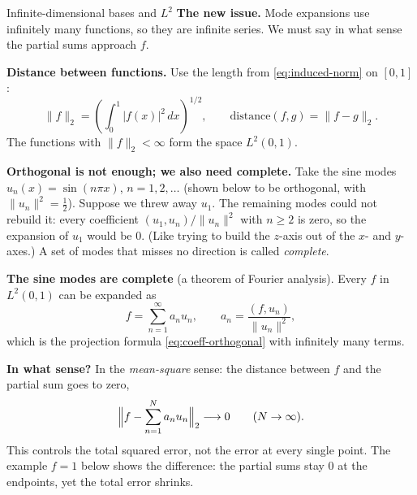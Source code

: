 \documentclass[11pt]{beamer}
\begin{document}
\begin{frame}[allowframebreaks=1.00]{Infinite-dimensional bases and $L^2$}
\footnotesize
\textbf{The new issue.} Mode expansions use infinitely many functions, so they are infinite series. We
must say in what sense the partial sums approach \(f\).

\textbf{Distance between functions.} Use the length from \eqref{eq:induced-norm} on \([0,1]\):
\[
 \|f\|_2=\left(\int_0^1|f(x)|^2\,dx\right)^{1/2},\qquad \text{distance}(f,g)=\|f-g\|_2 .
\]
The functions with \(\|f\|_2<\infty\) form the space \(L^2(0,1)\).

\textbf{Orthogonal is not enough; we also need complete.} Take the sine modes \(u_n(x)=\sin(n\pi x)\),
\(n=1,2,\ldots\) (shown below to be orthogonal, with \(\|u_n\|^2=\frac12\)). Suppose we threw
away \(u_1\). The remaining modes could not rebuild it: every coefficient \((u_1,u_n)/\|u_n\|^2\) with \(n\ge2\) is
zero, so the expansion of \(u_1\) would be \(0\). (Like trying to build the \(z\)-axis out of the \(x\)- and
\(y\)-axes.) A set of modes that misses no direction is called \emph{complete}.
\par\framebreak\par
\textbf{The sine modes are complete} (a theorem of Fourier analysis). Every \(f\) in \(L^2(0,1)\) can be
expanded as
\[
 f=\sum_{n=1}^{\infty}a_nu_n,\qquad
 a_n=\frac{(f,u_n)}{\|u_n\|^2},
\]
which is the projection formula \eqref{eq:coeff-orthogonal} with infinitely many terms.

\textbf{In what sense?} In the \emph{mean-square} sense: the distance between \(f\) and the partial sum
goes to zero,
\[
 \Bigl\|f-\sum_{n=1}^{N}a_nu_n\Bigr\|_2\longrightarrow0\qquad(N\to\infty).
\]
This controls the total squared error, not the error at every single point. The example \(f=1\) below
shows the difference: the partial sums stay \(0\) at the endpoints, yet the total error shrinks.
\end{frame}
\end{document}
